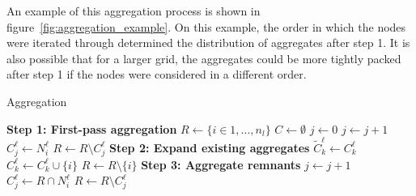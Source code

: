 An example of this aggregation process is shown in figure~\ref{fig:aggregation_example}. On this example, the order in which the nodes were iterated through determined the distribution of aggregates after step 1. It is also possible that for a larger grid, the aggregates could be more tightly packed after step 1 if the nodes were considered in a different order.

\begin{algorithm}
	\caption{Aggregation}\label{alg:aggregation}
	\begin{algorithmic}[1]
			\Statex \textbf{Step 1: First-pass aggregation}
			\State $R \gets \{ i \in 1, \ldots, n_l\}$ 
			\State $C \gets \emptyset$ 
			\State $j \gets 0$ 
					\State $j \gets j+1$
					\State $C_j^\ell \gets N_i^\ell$ 
					\State $R \gets R \setminus C_j^\ell$ 
				\EndIf
			\EndFor {}
			\Statex
			\Statex \textbf{Step 2: Expand existing aggregates}
				\State $\tilde{C}_k^\ell \gets C_k^\ell$
			\EndFor
			 
				 
					\State $C_k^\ell \gets C_k^\ell \cup \{ i \}$ 
					\State $R \gets R \setminus \{ i \} $
				\EndIf
			\EndFor
			\Statex
			\Statex \textbf{Step 3: Aggregate remnants}
			 
				\State $j \gets j + 1$
				\State $C_j^\ell \gets R \cap N_i^\ell$ 
				\State $R \gets R \setminus C_j^\ell$
			\EndFor
		\EndProcedure
	\end{algorithmic}
\end{algorithm}

